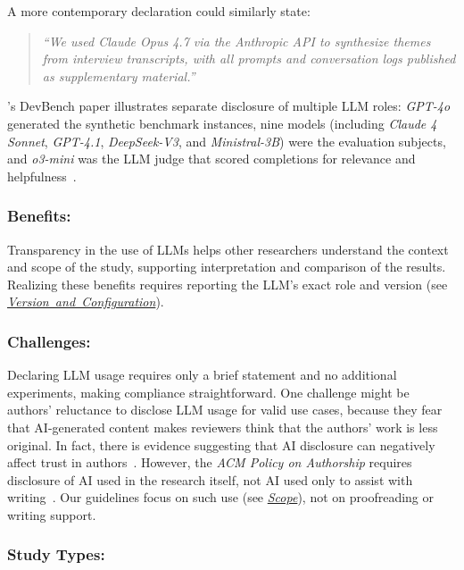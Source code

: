 \documentclass[smallextended]{svjour3}
\newcommand{\scope}{\hyperref[sec:scope]{\mbox{\emph{Scope}}}\xspace}
\newcommand{\scope}{\href{/scope/}{\emph{Scope}}\xspace}
\newcommand{\modelversion}{\hyperref[sec:report-model-version-configuration-and-customizations]{\mbox{\emph{Version and Configuration}}}\xspace}
\newcommand{\modelversion}{\href{/guidelines/model-version/}{\emph{Version and Configuration}}\xspace}
\newcommand{\guidelinesubsubsection}[1]{\subsubsection{\bfseries #1:}}
\newcommand{\guidelinesubsubsection}[1]{\subsubsection{#1}}
\begin{document}
\noindent A more contemporary declaration could similarly state:

\begin{quote}
\it
``We used Claude Opus 4.7 via the Anthropic API to synthesize themes from interview transcripts, with all prompts and conversation logs published as supplementary material.''
\end{quote}

\citeauthor{DBLP:journals/corr/abs-2601-11895}'s DevBench paper illustrates separate disclosure of multiple LLM roles: \emph{GPT-4o} generated the synthetic benchmark instances, nine models (including \emph{Claude 4 Sonnet}, \emph{GPT-4.1}, \emph{DeepSeek-V3}, and \emph{Ministral-3B}) were the evaluation subjects, and \emph{o3-mini} was the LLM judge that scored completions for relevance and helpfulness~\cite{DBLP:journals/corr/abs-2601-11895}.

\guidelinesubsubsection{Benefits}

Transparency in the use of LLMs helps other researchers understand the context and scope of the study, supporting interpretation and comparison of the results.
Realizing these benefits requires reporting the LLM's exact role and version (see \modelversion).

\guidelinesubsubsection{Challenges}

Declaring LLM usage requires only a brief statement and no additional experiments, making compliance straightforward.
One challenge might be authors' reluctance to disclose LLM usage for valid use cases, because they fear that AI-generated content makes reviewers think that the authors' work is less original.
In fact, there is evidence suggesting that AI disclosure can negatively affect trust in authors~\cite{SCHILKE2025104405}.
However, the \emph{ACM Policy on Authorship} requires disclosure of AI used in the research itself, not AI used only to assist with writing~\cite{ACM2026}.
Our guidelines focus on such use (see \scope), not on proofreading or writing support.

\guidelinesubsubsection{Study Types}
\end{document}
